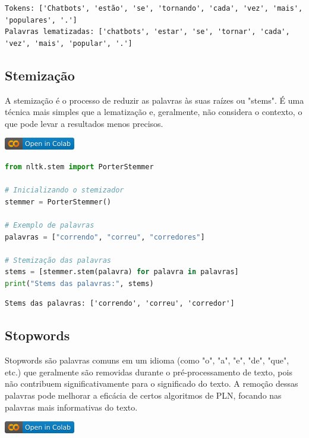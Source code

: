 \documentclass[14pt,a4paper,oneside]{book}
\begin{document}
\begin{lstlisting}
Tokens: ['Chatbots', 'estão', 'se', 'tornando', 'cada', 'vez', 'mais', 'populares', '.']
Palavras lematizadas: ['chatbots', 'estar', 'se', 'tornar', 'cada', 'vez', 'mais', 'popular', '.']
\end{lstlisting}

\subsection{Stemização}

A stemização é o processo de reduzir as palavras às suas raízes ou "stems". É uma técnica mais simples que a lematização e, geralmente, não considera o contexto, o que pode levar a resultados menos precisos.

\vspace{\baselineskip}
\href{https://colab.research.google.com/github/giseldo/chatbotbook/blob/main/notebook/pln/pln1_3.ipynb}{
  \includegraphics{./fig/colab-badge.png}
}

\begin{lstlisting}[language=Python]
from nltk.stem import PorterStemmer

# Inicializando o stemizador
stemmer = PorterStemmer()

# Exemplo de palavras
palavras = ["correndo", "correu", "corredores"]

# Stemização das palavras
stems = [stemmer.stem(palavra) for palavra in palavras]
print("Stems das palavras:", stems)
\end{lstlisting}

\begin{lstlisting}
Stems das palavras: ['correndo', 'correu', 'corredor']
\end{lstlisting}

\subsection{Stopwords}

Stopwords são palavras comuns em um idioma (como "o", "a", "e", "de", "que", etc.) que geralmente são removidas durante o pré-processamento de texto, pois não contribuem significativamente para o significado do texto. A remoção dessas palavras pode melhorar a eficácia de certos algoritmos de PLN, focando nas palavras mais informativas do texto.

\vspace{\baselineskip}
\href{https://colab.research.google.com/github/giseldo/chatbotbook/blob/main/notebook/pln/pln1_4.ipynb}{
  \includegraphics{./fig/colab-badge.png}
}
\end{document}
